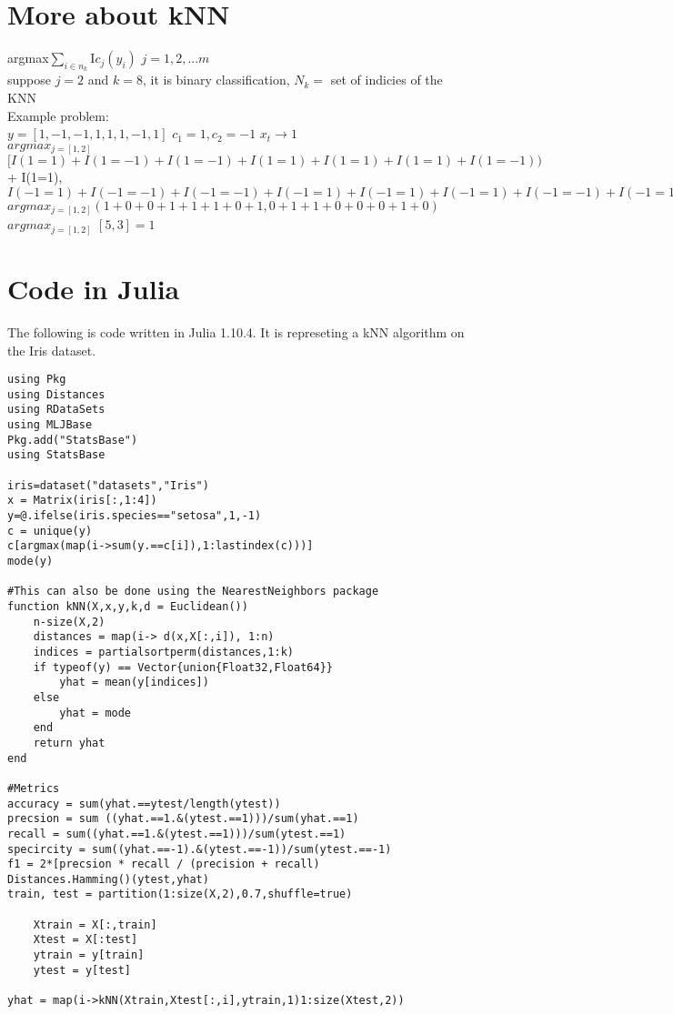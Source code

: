 \section{More about kNN \cite{guo2003knn}}
argmax$\sum_{i \in n_k}^{}$I$c_j(y_i)$ $j={1,2,...m}$ \\
suppose $j=2$ and $k=8$, it is binary classification, $N_k=$ set of indicies of the KNN \\

Example problem: \\
$y=[1,-1,-1,1,1,1,-1,1]$ $c_1=1,c_2=-1$ $x_t \rightarrow 1$ \\
$argmax_{j=[1,2]}$$[I(1=1)+I(1=-1)+I(1=-1)+I(1=1)+I(1=1)+I(1=1)+I(1=-1))$ \\
 + I(1=1), \\
$I(-1=1)+I(-1=-1)+I(-1=-1)+I(-1=1)+I(-1=1)+I(-1=1)+I(-1=-1)+I(-1=1)$ \\
$argmax_{j=[1,2]} (1+0+0+1+1+1+0+1, 0+1+1+0+0+0+1+0)$\\
$argmax_{j=[1,2]}$ $[5,3]=1$


\section{Code in Julia}
The following is code written in Julia 1.10.4. 
It is represeting a kNN algorithm on the Iris dataset.

\begin{lstlisting}
using Pkg
using Distances
using RDataSets
using MLJBase
Pkg.add("StatsBase")
using StatsBase

iris=dataset("datasets","Iris")
x = Matrix(iris[:,1:4])
y=@.ifelse(iris.species=="setosa",1,-1)
c = unique(y)
c[argmax(map(i->sum(y.==c[i]),1:lastindex(c)))]
mode(y)

#This can also be done using the NearestNeighbors package
function kNN(X,x,y,k,d = Euclidean())
    n-size(X,2)
    distances = map(i-> d(x,X[:,i]), 1:n)
    indices = partialsortperm(distances,1:k)
    if typeof(y) == Vector{union{Float32,Float64}}
        yhat = mean(y[indices])
    else
        yhat = mode
    end
    return yhat
end

#Metrics
accuracy = sum(yhat.==ytest/length(ytest))
precsion = sum ((yhat.==1.&(ytest.==1)))/sum(yhat.==1)
recall = sum((yhat.==1.&(ytest.==1)))/sum(ytest.==1)
specircity = sum((yhat.==-1).&(ytest.==-1))/sum(ytest.==-1)
f1 = 2*[precsion * recall / (precision + recall)
Distances.Hamming()(ytest,yhat)
train, test = partition(1:size(X,2),0.7,shuffle=true)

    Xtrain = X[:,train]
    Xtest = X[:test]
    ytrain = y[train]
    ytest = y[test]

yhat = map(i->kNN(Xtrain,Xtest[:,i],ytrain,1)1:size(Xtest,2))

\end{lstlisting}

